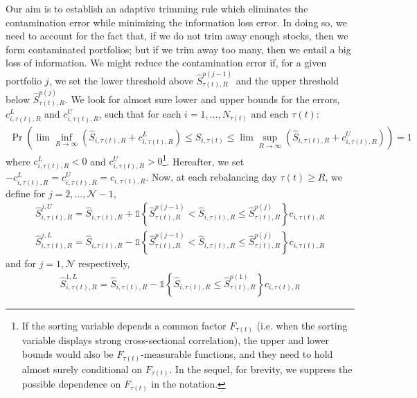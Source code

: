 Our aim is to establish an adaptive trimming rule which eliminates the contamination error while minimizing the information loss error. In doing so, we need to account for the fact that, if we do not trim away enough stocks, then we form contaminated portfolios; but if we trim away too many, then we entail a big loss of information. We might reduce the contamination error if, for a given portfolio $j$, we set the lower threshold above $\widehat{S}_{\tau(t),R}^{p(j-1)}$ and the upper threshold below $\widehat{S}_{\tau(t),R}^{p(j)}$. We look for almost sure lower and upper bounds for the errors, $c^L_{i,\tau(t),R}$ and $c^U_{i,\tau(t),R}$, such that for each $i=1,\dots,N_{\tau(t)}$ and each $\tau(t)$: 
\begin{align}
\label{almostsurebounds}
	\mathrm{\Pr} \left( \lim \inf_{R \to \infty} \left( \widehat{S}_{i,\tau(t),R} + c^L_{i,\tau(t),R} \right) \leq S_{i,\tau(t)} \leq \lim \sup_{R \to \infty} \left( \widehat{S}_{i,\tau(t),R} + c^U_{i,\tau(t),R} \right) \right) = 1
\end{align}
where $c^L_{i,\tau(t),R} < 0$ and $c^U_{i,\tau(t),R} > 0$\footnote{If the sorting variable depends a common factor $F_{\tau(t)}$ (i.e. when the sorting variable displays strong cross-sectional correlation), the upper and lower bounds would also be $F_{\tau(t)}$-measurable functions, and they need to hold almost surely conditional on $F_{\tau(t)}$. In the sequel, for brevity, we suppress the possible dependence on $F_{\tau(t)}$ in the notation.
}. Hereafter, we set $- c^L_{i,\tau(t),R} = c^U_{i,\tau(t),R} = c_{i,\tau(t),R}$. Now, at each rebalancing day $\tau(t) \geq R$, we define for $j=2,\dots,\mathcal{N}-1$, 
\begin{align*}
	\widehat{S}_{i,\tau(t),R}^{j,U} = \widehat{S}_{i,\tau(t),R} + \mathds{1} \left\{ \widehat{S}_{\tau(t),R}^{p(j-1)} <\widehat{S}_{i,\tau(t),R} \leq \widehat{S}_{\tau(t),R}^{p(j)} \right\} c_{i,\tau(t),R}
\end{align*}
\begin{align*}
	\widehat{S}_{i,\tau(t),R}^{j,L} = \widehat{S}_{i,\tau(t),R} - \mathds{1} \left\{ \widehat{S}_{\tau(t),R}^{p(j-1)} < \widehat{S}_{i,\tau(t),R} \leq \widehat{S}_{\tau(t),R}^{p(j)} \right\} c_{i,\tau(t),R} 
\end{align*}
and for $j=1, \mathcal{N}$ respectively,
\begin{align*}
	\widehat{S}_{i,\tau(t),R}^{1,L} = \widehat{S}_{i,\tau(t),R} - \mathds{1} \left\{ \widehat{S}_{i,\tau(t),R} \leq \widehat{S}_{\tau(t),R}^{p(1)} \right\} c_{i,\tau(t),R} 
\end{align*}
